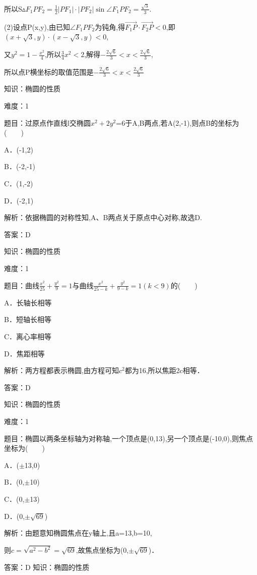 \documentclass{article} %
\begin{document}
所以S${\vartriangle}F_{1}PF_{2}=\frac{1}{2}|PF_1|\cdot |PF_2|\sin \angle F_1PF_2=\frac{\sqrt{3}}{3}$.

(2)设点P(x,y),由已知${\angle}F_{1}PF_{2}$为钝角,得$\overrightarrow{F_1P}\cdot \overrightarrow{F_2P}<0$,即$(x+\sqrt{3},y)\cdot(x-\sqrt{3},y)<0$,

又$y^{2}=1-\frac{x^2}{4}$,所以$\frac{3}{4}x^{2}<2$,解得$-\frac{2\sqrt{6}}{3}<x<\frac{2\sqrt{6}}{3}$,

所以点P横坐标的取值范围是$-\frac{2\sqrt{6}}{3}<x<\frac{2\sqrt{6}}{3}$



知识：椭圆的性质

难度：1

题目：过原点作直线l交椭圆$x^{2}+2y^{2}$=6于A,B两点,若A(2,-1),则点B的坐标为(　　)

A．(-1,2)　　　　 

B．(-2,-1)

C．(1,-2)   

D．(-2,1)

解析：依据椭圆的对称性知,A、B两点关于原点中心对称,故选D.

答案：D



知识：椭圆的性质

难度：1

题目：曲线$\frac{x^2}{25}+\frac{y^2}{9}=1$与曲线$\frac{x^2}{25-k}+\frac{y^2}{9-k}=1(k<9)$的(　　)

A．长轴长相等   

B．短轴长相等

C．离心率相等   

D．焦距相等

解析：两方程都表示椭圆,由方程可知$c^{2}$都为16,所以焦距2c相等．

答案：D



知识：椭圆的性质

难度：1

题目：椭圆以两条坐标轴为对称轴,一个顶点是(0,13),另一个顶点是(-10,0),则焦点坐标为(　　)

A．(${\pm}$13,0)   

B．(0,${\pm}$10)

C．(0,${\pm}$13)   

D．(0,${\pm}\sqrt{69}$)

解析：由题意知椭圆焦点在y轴上,且a=13,b=10,

则$c=\sqrt{a^2-b^2}=\sqrt{69}$,故焦点坐标为(0,${\pm}\sqrt{69}$)．

答案：D
知识：椭圆的性质
\end{document}
